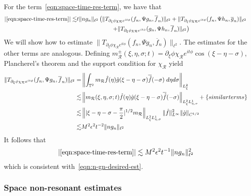 \documentclass[letterpaper, reqno,final]{amsart}
\newcommand{\bbT}{\mathbb{T}}
\newcommand{\cR}{\mathcal{R}}
\newcommand{\fhPi}{\frac{\pi}{2}}
\newcommand{\discrAvg}{\Psi}
\newcommand{\btext}[1]{\left\{\textup{#1}\right\}}
\newcommand{\bsim}{\btext{similar terms}}
\begin{document}
For the term~\eqref{eqn:space-time-res-term}, we have that
\begin{equation*}\begin{split}
    |\eqref{eqn:space-time-res-term}| \lesssim& t \lVert n g_n \rVert_{\ell^2} \left( \lVert T_{\partial_\xi \phi \chi_\cR e^{it\phi}}(f_n, \discrAvg g_{n}, \overline{f}_n)\rVert_{\ell^2} + \lVert T_{\partial_\xi \phi \chi_\cR e^{it\phi}}(f_n, \discrAvg h_{n}, \overline{g}_n)\rVert_{\ell^2}\right. \\
    &\qquad\qquad\qquad\left.+ \lVert T_{\partial_\xi \phi \chi_\cR e^{it\phi}}(g_n, \discrAvg h_{n}, \overline{f}_n)\rVert_{\ell^2}\right)
\end{split}\end{equation*}
We will show how to estimate $\lVert T_{\partial_\xi \phi \chi_\cR e^{it \phi}}(f_n, \Psi g_n, \overline{f}_n)\rVert_{\ell^2}$.  The estimates for the other terms are analogous.  Defining $m_\cR^{\pm}(\xi,\eta,\sigma;t) = \partial_\xi \phi \chi_\cR e^{it \phi} \cos(\xi -\eta - \sigma)$, Plancherel's theorem and the support condition for $\chi_\cR$ yield
\begin{equation*}\begin{split}
    \lVert T_{\partial_\xi \phi \chi_\cR e^{it \phi}}(f_n, \Psi g_n, \overline{f}_n) \rVert_{\ell^2} =& \left\lVert\int_{\bbT^2} m_\cR \hat{f}(\eta) \hat{g}(\xi - \eta - \sigma) \overline{\hat{f}}(-\sigma) \;d\eta d\sigma \right\rVert_{L^2_\xi}\\
    \lesssim&  \left\lVert m_\cR(\xi,\eta,\sigma;t) \hat{f}(\eta) \hat{g}(\xi - \eta - \sigma) \overline{\hat{f}}(-\sigma) \right\rVert_{L^2_\xi L^1_{\eta,\sigma}} + \bsim\\
    \lesssim& \left\lVert |\xi - \eta - \sigma - \fhPi|^{1/2} m_\cR  \right\rVert_{L^2_\xi L^1_{\eta,\sigma}} \lVert \hat{f} \rVert_{L^\infty}^2 \lVert \hat{g} \rVert_{C^{1/2}}\\
    \lesssim& M^2 \epsilon^2 t^{-2}\lVert ng_n \rVert_{\ell^2}
\end{split}\end{equation*}
It follows that
\begin{equation*}
    |\eqref{eqn:space-time-res-term}| \lesssim M^2 \epsilon^2 t^{-1} \lVert ng_n \rVert_{\ell^2}^2
\end{equation*}
which is consistent with~\eqref{eqn:n-gn-desired-est}.


\subsubsection{Space non-resonant estimates}
\end{document}
